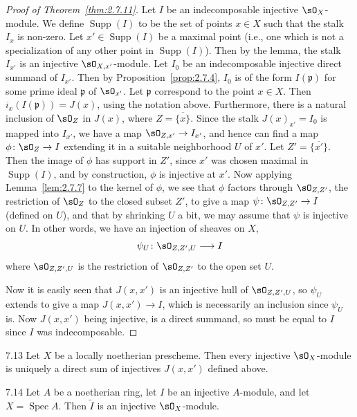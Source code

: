 \begin{proof}[Proof of Theorem~\ref{thm:2.7.11}]
Let $I$ be an indecomposable injective $\sO_X$-module. We define $\operatorname{Supp}(I)$ to be the set of points $x\in X$ such that the stalk $I_x$ is non-zero. Let $x'\in\operatorname{Supp}(I)$ be a maximal point (i.e., one which is not a specialization of any other point in $\operatorname{Supp}(I)$). Then by the lemma, the stalk $I_{x'}$ is an injective $\sO_{X,x'}$-module. Let $I_0$ be an indecomposable injective direct summand of $I_{x'}$. Then by Proposition~\ref{prop:2.7.4}, $I_0$ is of the form $I(\mathfrak{p})$ for some prime ideal $\mathfrak{p}$ of $\sO_{x'}$. Let $\mathfrak{p}$ correspond to the point $x\in X$. Then $i_x(I(\mathfrak{p}))=J(x)$, using the notation above. Furthermore, there is a natural inclusion of $\sO_Z$ in $J(x)$, where $Z=\overline{\{x\}}$. Since the stalk $J(x)_{x'}=I_0$ is mapped into $I_{x'}$, we have a map $\sO_{Z,x'}\to I_{x'}$, and hence can find a map $\phi\colon\sO_Z\to I$ extending it in a suitable neighborhood $U$ of $x'$. Let $Z'=\overline{\{x'\}}$. Then the image of $\phi$ has support in $Z'$, since $x'$ was chosen maximal in $\operatorname{Supp}(I)$, and by construction, $\phi$ is injective at $x'$. Now applying Lemma~\ref{lem:2.7.7} to the kernel of $\phi$, we see that $\phi$ factors through $\sO_{Z,Z'}$, the restriction of $\sO_Z$ to the closed subset $Z'$, to give a map $\psi\colon\sO_{Z,Z'}\to I$ (defined on $U$), and that by shrinking $U$ a bit, we may assume that $\psi$ is injective on $U$. In other words, we have an injection of sheaves on $X$,
\[
\psi_U\colon \sO_{Z,Z',U} \longrightarrow I
\]
where $\sO_{Z,Z',U}$ is the restriction of $\sO_{Z,Z'}$ to the open set $U$.

Now it is easily seen that $J(x,x')$ is an injective hull of $\sO_{Z,Z',U}$, so $\psi_U$ extends to give a map $J(x,x')\to I$, which is necessarily an inclusion since $\psi_U$ is. Now $J(x,x')$ being injective, is a direct summand, so must be equal to $I$ since $I$ was indecomposable.
\end{proof}

\begin{bookcorollary}{7.13}\label{cor:2.7.13}
Let $X$ be a locally noetherian prescheme. Then every injective $\sO_X$-module is uniquely a direct sum of injectives $J(x,x')$ defined above.
\end{bookcorollary}

\begin{bookcorollary}{7.14}\label{cor:2.7.14}
Let $A$ be a noetherian ring, let $I$ be an injective $A$-module, and let $X=\operatorname{Spec}A$. Then $\widetilde{I}$ is an injective $\sO_X$-module.
\end{bookcorollary}

